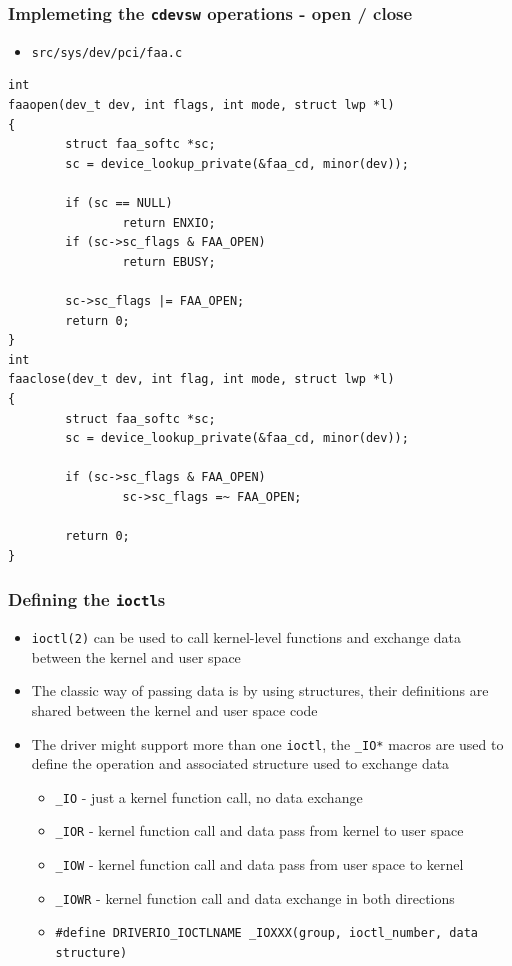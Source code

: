 \documentclass[dvipsnames,table]{beamer}
\begin{document}
\begin{frame}[fragile]
\frametitle{Implemeting the {\tt cdevsw} operations - open / close}
\begin{itemize}
	\item {\tt src/sys/dev/pci/faa.c}
\end{itemize}
\begin{lstlisting}
int
faaopen(dev_t dev, int flags, int mode, struct lwp *l)
{
        struct faa_softc *sc;
        sc = device_lookup_private(&faa_cd, minor(dev));

        if (sc == NULL)
                return ENXIO;
        if (sc->sc_flags & FAA_OPEN)
                return EBUSY;

        sc->sc_flags |= FAA_OPEN;
        return 0;
}
int
faaclose(dev_t dev, int flag, int mode, struct lwp *l)
{
        struct faa_softc *sc;
        sc = device_lookup_private(&faa_cd, minor(dev));

        if (sc->sc_flags & FAA_OPEN)
                sc->sc_flags =~ FAA_OPEN;

        return 0;
}
\end{lstlisting}
\end{frame}

\begin{frame}
\frametitle{Defining the {\tt ioctl}s}
\begin{itemize}
	\item {\tt ioctl(2)} can be used to call kernel-level functions and exchange data between the kernel and user space
	\item The classic way of passing data is by using structures, their definitions are shared between the kernel and user space code
	\item The driver might support more than one {\tt ioctl}, the {\tt \_IO*} macros are used to define the operation and associated structure used to exchange data
	\begin{itemize}
		\item {\tt \_IO} - just a kernel function call, no data exchange
		\item {\tt \_IOR} - kernel function call and data pass from kernel to user space
		\item {\tt \_IOW} - kernel function call and data pass from user space to kernel
		\item {\tt \_IOWR} - kernel function call and data exchange in both directions
		\item {\tt \#define DRIVERIO\_IOCTLNAME	\_IOXXX(group, ioctl\_number, data structure)}
	\end{itemize}
\end{itemize}
\end{frame}
\end{document}
